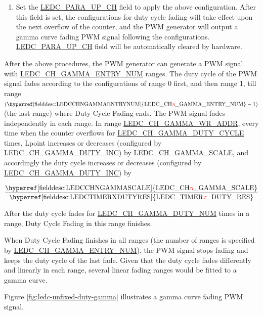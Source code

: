 \documentclass[main\_\_EN.tex]{subfiles}
\begin{document}
\begin{enumerate}
    \item Set the \hyperref[fielddesc:LEDCPARAUPCHN]{LEDC\_PARA\_UP\_CH} field to apply the above configuration. After this field is set, the configurations for duty cycle fading will take effect upon the next overflow of the counter, and the PWM generator will output a gamma curve fading PWM signal following the configurations. \hyperref[fielddesc:LEDCPARAUPCHN]{LEDC\_PARA\_UP\_CH} field will be automatically cleared by hardware.
\end{enumerate}

After the above procedures, the PWM generator can generate a PWM signal with \hyperref[fielddesc:LEDCCHNGAMMAENTRYNUM]{LEDC\_CH\_GAMMA\_ENTRY\_NUM} ranges. The duty cycle of the PWM signal fades according to the configurations of range 0 first, and then range 1, till range $ (\textrm{\hyperref[fielddesc:LEDCCHNGAMMAENTRYNUM]{LEDC\_CH\regindex{n}\_GAMMA\_ENTRY\_NUM}} -1) $  (the last range) where Duty Cycle Fading ends. The PWM signal fades independently in each range. In range \hyperref[regdesc:LEDCCHNGAMMAWRADDRREG]{LEDC\_CH\_GAMMA\_WR\_ADDR}, every time when the counter overflows for \hyperref[fielddesc:LEDCCHNGAMMADUTYCYCLE]{LEDC\_CH\_GAMMA\_DUTY\_CYCLE} times, Lpoint increases or decreases (configured by \hyperref[fielddesc:LEDCCHNGAMMADUTYINC]{LEDC\_CH\_GAMMA\_DUTY\_INC}) by \hyperref[fielddesc:LEDCCHNGAMMASCALE]{LEDC\_CH\_GAMMA\_SCALE}, and accordingly the duty cycle increases or decreases (configured by \hyperref[fielddesc:LEDCCHNGAMMADUTYINC]{LEDC\_CH\_GAMMA\_DUTY\_INC}) by

    \[
    \frac{\textrm{\hyperref[fielddesc:LEDCCHNGAMMASCALE]{LEDC\_CH\regindex{n}\_GAMMA\_SCALE}}}{\textrm{\hyperref[fielddesc:LEDCTIMERXDUTYRES]{LEDC\_TIMER\regindex{x}\_DUTY\_RES}}}
    \]

After the duty cycle fades for \hyperref[fielddesc:LEDCCHNGAMMADUTYNUM]{LEDC\_CH\_GAMMA\_DUTY\_NUM} times in a range, Duty Cycle Fading in this range finishes.

When Duty Cycle Fading finishes in all ranges (the number of ranges is specified by \hyperref[fielddesc:LEDCCHNGAMMAENTRYNUM]{LEDC\_CH\_GAMMA\_ENTRY\_NUM}), the PWM signal stops fading and keeps the duty cycle of the last fade. Given that the duty cycle fades differently and linearly in each range, several linear fading ranges would be fitted to a gamma curve.

Figure \ref{fig:ledc-unfixed-duty-gamma} illustrates a gamma curve fading PWM signal.
\end{document}
